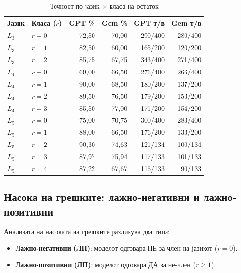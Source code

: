\documentclass[12pt,a4paper]{article}
\theoremstyle{definition}
\begin{document}
\begin{table}[H]
\centering
\begin{tabular}{llrrrr}
\toprule
\textbf{Јазик} & \textbf{Класа ($r$)} & \textbf{GPT \%} & \textbf{Gem \%} & \textbf{GPT т/в} & \textbf{Gem т/в} \\
\midrule
$L_3$ & $r=0$ & 72,50 & 70,00 & 290/400 & 280/400 \\
$L_3$ & $r=1$ & 82,50 & 60,00 & 165/200 & 120/200 \\
$L_3$ & $r=2$ & 85,75 & 67,75 & 343/400 & 271/400 \\
\midrule
$L_4$ & $r=0$ & 69,00 & 66,50 & 276/400 & 266/400 \\
$L_4$ & $r=1$ & 90,00 & 68,50 & 180/200 & 137/200 \\
$L_4$ & $r=2$ & 89,50 & 76,50 & 179/200 & 153/200 \\
$L_4$ & $r=3$ & 85,50 & 77,00 & 171/200 & 154/200 \\
\midrule
$L_5$ & $r=0$ & 75,00 & 70,75 & 300/400 & 283/400 \\
$L_5$ & $r=1$ & 88,00 & 66,50 & 176/200 & 133/200 \\
$L_5$ & $r=2$ & 90,30 & 74,63 & 121/134 & 100/134 \\
$L_5$ & $r=3$ & 87,97 & 75,94 & 117/133 & 101/133 \\
$L_5$ & $r=4$ & 87,22 & 67,67 & 116/133 & 90/133  \\
\bottomrule
\end{tabular}
\caption{Точност по јазик $\times$ класа на остаток}
\end{table}

\subsection{Насока на грешките: лажно-негативни и лажно-позитивни}
\label{subsec:error_direction}

Анализата на насоката на грешките разликува два типа:
\begin{itemize}
  \item \textbf{Лажно-негативни (ЛН)}: моделот одговара НЕ за член на јазикот ($r=0$).
  \item \textbf{Лажно-позитивни (ЛП)}: моделот одговара ДА за не-член ($r \geq 1$).
\end{itemize}
\end{document}
